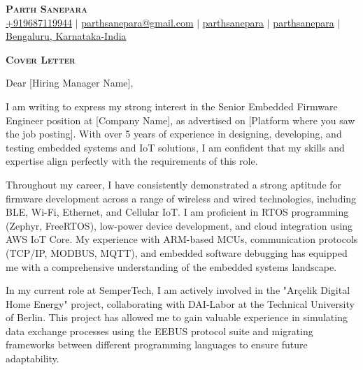 \documentclass[letterpaper,11pt]{article}
\begin{document}
\begin{center}
    \textbf{\Huge \scshape Parth Sanepara} \\ \vspace{3pt}
    \small
    \faMobile \hspace{.5pt} \href{tel:9687119944}{+919687119944}
    $|$
    \faAt \hspace{.5pt} \href{mailto:parthsanepara@gmail.com}{parthsanepara@gmail.com}
    $|$
    \faLinkedinSquare \hspace{.5pt} \href{https://www.linkedin.com/in/parthsanepara}{parthsanepara}
    $|$
    \faGithub \hspace{.5pt} \href{https://github.com/parthsanepara}{parthsanepara}
    $|$
    \faMapMarker \hspace{.5pt} \href{https://maps.app.goo.gl/cc5ibm6jAiXmRFp17}{Bengaluru, Karnataka-India}
\end{center}

\vspace{1cm}

\begin{center}
    \textbf{\Large \scshape Cover Letter} \\ \vspace{3pt}
\end{center}

\vspace{0.5cm}

  Dear [Hiring Manager Name],

  I am writing to express my strong interest in the Senior Embedded Firmware Engineer position at [Company Name], as advertised on [Platform where you saw the job posting]. With over 5 years of experience in designing, developing, and testing embedded systems and IoT solutions, I am confident that my skills and expertise align perfectly with the requirements of this role.

  Throughout my career, I have consistently demonstrated a strong aptitude for firmware development across a range of wireless and wired technologies, including BLE, Wi-Fi, Ethernet, and Cellular IoT. I am proficient in RTOS programming (Zephyr, FreeRTOS), low-power device development, and cloud integration using AWS IoT Core. My experience with ARM-based MCUs, communication protocols (TCP/IP, MODBUS, MQTT), and embedded software debugging has equipped me with a comprehensive understanding of the embedded systems landscape.

  In my current role at SemperTech, I am actively involved in the "Arçelik Digital Home Energy" project, collaborating with DAI-Labor at the Technical University of Berlin. This project has allowed me to gain valuable experience in simulating data exchange processes using the EEBUS protocol suite and migrating frameworks between different programming languages to ensure future adaptability.
\end{document}
